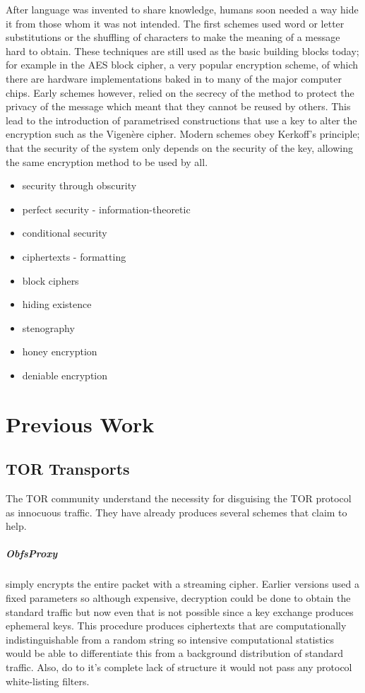 \documentclass[ %
                    author={Samuel Russell},
                supervisor={Prof. Bogdan Warinschi},
                    degree={MEng},
                     title={Innocuous Ciphertexts},
                  subtitle={The DE-CENSOR Scheme},
                      type={research},
                      year={2018} ]{dissertation}
\begin{document}
After language was invented to share knowledge, humans soon needed a way hide it from those whom it was not intended. The first schemes used word or letter substitutions or the shuffling of characters to make the meaning of a message hard to obtain. These techniques are still used as the basic building blocks today; for example in the AES block cipher, a very popular encryption scheme, of which there are hardware implementations baked in to many of the major computer chips. Early schemes however, relied on the secrecy of the method to protect the privacy of the message which meant that they cannot be reused by others. This lead to the introduction of parametrised constructions that use a key to alter the encryption such as the Vigen\`ere cipher. Modern schemes obey Kerkoff's principle; that the security of the system only depends on the security of the key, allowing the same encryption method to be used by all.
\begin{itemize}
 \item security through obscurity
 \item perfect security - information-theoretic
 \item conditional security
 \item ciphertexts - formatting
 \item block ciphers
\end{itemize}

\begin{itemize}
 \item hiding existence
 \item stenography
 \item honey encryption
 \item deniable encryption
\end{itemize}

\chapter{Previous Work}\label{prev_work}

\section{TOR Transports}

The TOR community understand the necessity for disguising the TOR protocol as innocuous traffic.
They have already produces several schemes that claim to help.

\paragraph{ObfsProxy} simply encrypts the entire packet with a streaming cipher. Earlier versions used a fixed parameters so although expensive, decryption could be done to obtain the standard traffic but now even that is not possible since a key exchange produces ephemeral keys. This procedure produces ciphertexts that are computationally indistinguishable from a random string so intensive computational statistics would be able to differentiate this from a background distribution of standard traffic. Also, do to it's complete lack of structure it would not pass any protocol white-listing filters.
\end{document}
